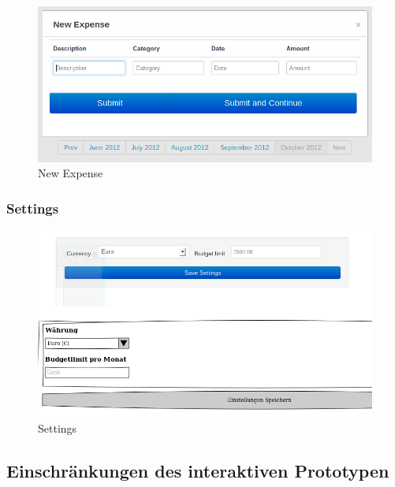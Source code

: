 \documentclass[a4paper,10pt]{article}
\begin{document}
\begin{figure}
\centering
\includegraphics[width=\textwidth]{expenses-new-ip}
\caption{New Expense} \label{fig:expenses-new}
\end{figure}


\clearpage
\subsubsection{Settings}

\begin{figure}
\centering
\includegraphics[width=\textwidth]{settings}
\caption{Settings} \label{fig:settings}
\end{figure}


\clearpage
\subsection{Einschränkungen des interaktiven Prototypen}

\end{document}
